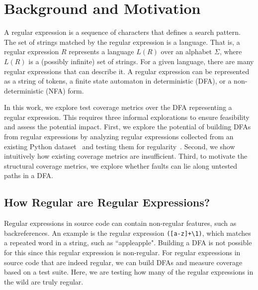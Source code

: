 

\section{Background and Motivation}
\label{sec:motive}
A regular expression is a sequence of characters that defines a search pattern. 
The set of strings matched by the regular expression is a language. 
That is, a regular expression $R$ represents a language $L(R)$ over an alphabet $\Sigma$, where $L(R)$ is a (possibly infinite) set of strings. 
For a given language, there are many regular expressions that can describe it. 
A regular expression can be represented as a string of tokens, a finite state automaton in deterministic (DFA), or a non-deterministic (NFA) form.%


In this work, we explore test coverage metrics over the DFA representing a regular expression. This requires three informal explorations to ensure feasibility and assess the potential impact. 
First, we explore the potential of building DFAs from regular expressions by analyzing regular expressions collected from an existing Python dataset~\cite{chapman2016} and testing them for regularity~\cite{sipser2006introduction}.
Second, we show intuitively how existing coverage metrics are insufficient. 
Third, to motivate the structural coverage metrics, we explore whether faults can lie along untested paths in a DFA. 



\subsection{How Regular are Regular Expressions?}
\label{regularregularexpressions}
Regular expressions in source code can contain non-regular features, such as backreferences. An example is the regular expression \verb!([a-z]+\1)!, which matches a repeated word in a string, such as ``appleapple". Building a DFA is not possible for this since this regular expression is non-regular. For regular expressions in source code that are indeed regular, we can build DFAs and measure coverage based on a test suite. 
Here, we are testing how many of the regular expressions in the wild are truly regular. 

